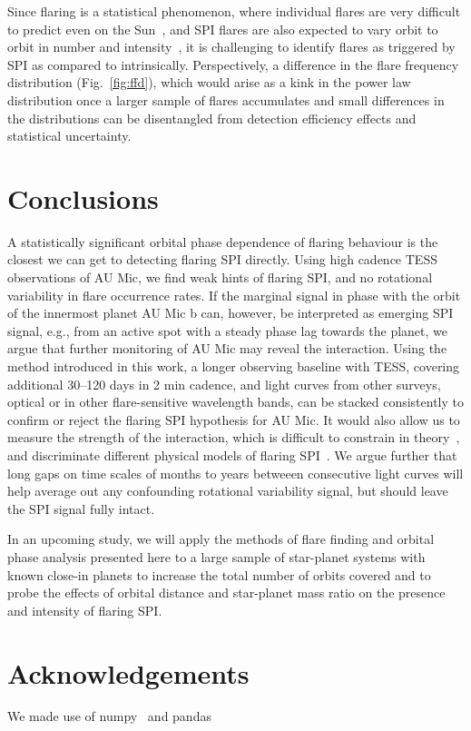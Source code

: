 \documentclass[fleqn,usenatbib,letters]{mnras}%
\begin{document}
Since flaring is a statistical phenomenon, where individual flares are very difficult to predict even on the Sun~\citep{barnes2016}, and SPI flares are also expected to vary orbit to orbit in number and intensity~\citep{shkolnik2008,lanza2009, strugarek2015}, it is challenging to identify flares as triggered by SPI as compared to intrinsically. Perspectively, a difference in the flare frequency distribution (Fig.~\ref{fig:ffd}), which would arise as a kink in the power law distribution once a larger sample of flares accumulates and small differences in the distributions can be disentangled from detection efficiency effects and statistical uncertainty.


\section{Conclusions}
\label{sec:conclusions}
A statistically significant orbital phase dependence of flaring behaviour is the closest we can get to detecting flaring SPI directly. Using high cadence TESS observations of AU Mic, we find weak hints of flaring SPI, and no rotational variability in flare occurrence rates. If the marginal  signal in phase with the orbit of the innermost planet AU Mic b can, however, be interpreted as emerging SPI signal, e.g., from an active spot with a steady phase lag towards the planet, we argue that further monitoring of AU Mic may reveal the interaction. 
Using the method introduced in this work, a longer observing baseline with TESS, covering additional 30--120 days in 2 min cadence, and light curves from other surveys, optical or in other flare-sensitive wavelength bands, can be stacked consistently to confirm or reject the flaring SPI hypothesis for AU Mic. It would also allow us to measure the strength of the interaction, which is difficult to constrain in theory~\citep{strugarek2019}, and discriminate different physical models of flaring SPI~\citep{lanza2018}. We argue further that long gaps on time scales of months to years betweeen consecutive light curves will help average out any confounding rotational variability signal, but should leave the SPI signal fully intact.

In an upcoming study, we will apply the methods of flare finding and orbital phase analysis presented here to a large sample of star-planet systems with known close-in planets to increase the total number of orbits covered and to probe the effects of orbital distance and star-planet mass ratio on the presence and intensity of flaring SPI.
\section*{Acknowledgements}
We made use of numpy~\citep{numpy2020} and pandas~\citep{pandas2010,pandas2020software}
\end{document}

